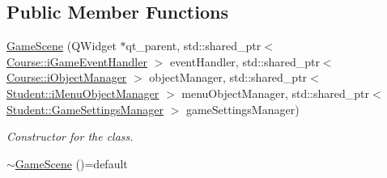 \subsection*{Public Member Functions}
\begin{DoxyCompactItemize}
\item 
\hyperlink{class_student_1_1_game_scene_a581998b6cbdf8f29a2d2ae1751d47f75}{Game\-Scene} (Q\-Widget $\ast$qt\-\_\-parent, std\-::shared\-\_\-ptr$<$ \hyperlink{class_course_1_1i_game_event_handler}{Course\-::i\-Game\-Event\-Handler} $>$ event\-Handler, std\-::shared\-\_\-ptr$<$ \hyperlink{class_course_1_1i_object_manager}{Course\-::i\-Object\-Manager} $>$ object\-Manager, std\-::shared\-\_\-ptr$<$ \hyperlink{class_student_1_1i_menu_object_manager}{Student\-::i\-Menu\-Object\-Manager} $>$ menu\-Object\-Manager, std\-::shared\-\_\-ptr$<$ \hyperlink{class_student_1_1_game_settings_manager}{Student\-::\-Game\-Settings\-Manager} $>$ game\-Settings\-Manager)
\begin{DoxyCompactList}\small\item\em Constructor for the class. \end{DoxyCompactList}\item 
\hypertarget{class_student_1_1_game_scene_a27134d9be436038e0f5184803574a1c4}{\hyperlink{class_student_1_1_game_scene_a27134d9be436038e0f5184803574a1c4}{$\sim$\-Game\-Scene} ()=default}\label{class_student_1_1_game_scene_a27134d9be436038e0f5184803574a1c4}


\end{DoxyCompactItemize}
